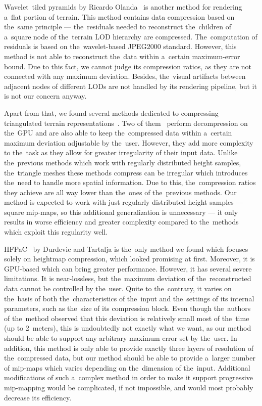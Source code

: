  Wavelet~tiled pyramids by Ricardo Olanda~\cite{jpeg2000terrain} is another method for rendering a~flat portion of terrain. This method contains data compression based on the~same principle --- the~residuals needed to reconstruct the~children of a~square node of the~terrain LOD hierarchy are compressed. The~computation of residuals is based on the~wavelet-based JPEG2000 standard. However, this method is not able to reconstruct the~data within a~certain maximum-error bound. Due to this fact, we cannot judge its compression ratios, as they are not connected with any maximum deviation. Besides, the~visual artifacts between adjacent nodes of different LODs are not handled by its rendering pipeline, but it is not our concern anyway.
 
 Apart from that, we found several methods dedicated to compressing triangulated terrain representations~\cite{meshesUU1, meshesGPU2, meshes}. Two of them~\cite{meshesGPU1, meshesGPU2} perform decompression on the~GPU and are also able to keep the~compressed data within a~certain maximum deviation adjustable by the~user. However, they add more complexity to the~task as they allow for greater irregularity of their input data. Unlike the~previous methods which work with regularly distributed height samples, the~triangle meshes these methods compress can be irregular which introduces the~need to handle more spatial information. Due to this, the~compression ratios they achieve are all way lower than the~ones of the~previous methods. Our method is expected to work with just regularly distributed height samples --- square mip-maps, so this additional generalization is unnecessary --- it only results in worse efficiency and greater complexity compared to the~methods which exploit this regularity well.
 
 HFPaC~\cite{fieldGPU} by Durdevic and Tartalja is the~only method we found which focuses solely on heightmap compression, which looked promising at first. Moreover, it is GPU-based which can bring greater performance. However, it has several severe limitations. It is near-lossless, but the~maximum deviation of the~reconstructed data cannot be controlled by the~user. Quite to the~contrary, it varies on the~basis of both the~characteristics of the~input and the~settings of its internal parameters, such as the~size of its compression block. Even though the~authors of the~method observed that this deviation is relatively small most of the~time (up to 2~meters), this is undoubtedly not exactly what we want, as our method should be able to support any arbitrary maximum error set by the~user. In addition, this method is only able to provide exactly three layers of resolution of the~compressed data, but our method should be able to provide a~larger number of mip-maps which varies depending on the~dimension of the~input. Additional modifications of such a~complex method in order to make it support progressive mip-mapping would be complicated, if not impossible, and would most probably decrease its efficiency.
 
